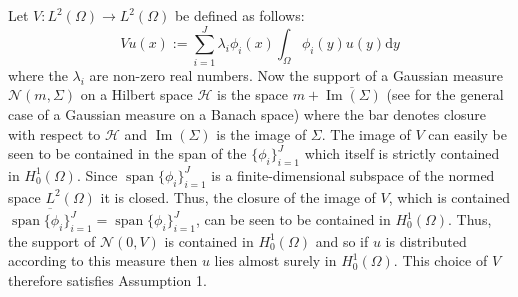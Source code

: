 Let $V:L^{2}(\Omega)\rightarrow L^{2}(\Omega)$ be defined as follows:
\begin{equation}
    \label{FEM_prior}
    Vu(x):=\sum_{i=1}^{J}\lambda_{i}\phi_{i}(x)\int_{\Omega}\phi_{i}(y)u(y)\mathrm{d}y
\end{equation}
where the $\lambda_{i}$ are non-zero real numbers. Now the support of a Gaussian measure $\mathcal{N}(m,\Sigma)$ on a Hilbert space $\mathcal{H}$ is the space $m+\overline{\operatorname{Im}(\Sigma)}$ (see \textcolor{blue}{\citep{vakhania1975topological}} for the general case of a Gaussian measure on a Banach space) where the bar denotes closure with respect to $\mathcal{H}$ and $\operatorname{Im}(\Sigma)$ is the image of $\Sigma$. The image of $V$ can easily be seen to be contained in the span of the $\{\phi_{i}\}_{i=1}^{J}$ which itself is strictly contained in $H_{0}^{1}(\Omega)$. Since $\operatorname{span}\{\phi_{i}\}_{i=1}^{J}$ is a finite-dimensional subspace of the normed space $L^{2}(\Omega)$ it is closed. Thus, the closure of the image of $V$, which is contained $\overline{\operatorname{span}\{\phi_{i}\}_{i=1}^{J}}=\operatorname{span}\{\phi_{i}\}_{i=1}^{J}$, can be seen to be contained in $H_{0}^{1}(\Omega)$. Thus, the support of $\mathcal{N}(0,V)$ is contained in $H_{0}^{1}(\Omega)$ and so if $u$ is distributed according to this measure then $u$ lies almost surely in $H_{0}^{1}(\Omega)$. This choice of $V$ therefore satisfies Assumption 1. \vspace{5pt}

